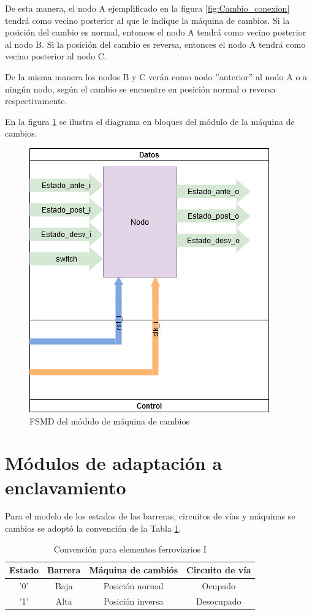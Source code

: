 	De esta manera, el nodo A ejemplificado en la figura \ref{fig:Cambio_conexion} tendrá como vecino posterior al que le indique la máquina de cambios. Si la posición del cambio es normal, entonces el nodo A tendrá como vecino posterior al nodo B. Si la posición del cambio es reversa, entonces el nodo A tendrá como vecino posterior al nodo C.
	
	De la misma manera los nodos B y C verán como nodo ''anterior'' al nodo A o a ningún nodo, según el cambio se encuentre en posición normal o reversa respectivamente.	
	
	En la figura \ref{fig:FSMD_Cambio} se ilustra el diagrama en bloques del módulo de la máquina de cambios.
	
	\begin{figure}[h]
	\centering
	\includegraphics[scale=.5]{./Figures/FSMD-Cambio}
		\caption{FSMD del módulo de máquina de cambios}
		\label{fig:FSMD_Cambio}
	\end{figure}
		
	
\section{Módulos de adaptación a enclavamiento}
	
	Para el modelo de los estados de las barreras, circuitos de vías y máquinas se cambios se adoptó la convención de la Tabla \ref{Bool_1}.
	
	\begin{table}[!hbt]
	\renewcommand{\arraystretch}{1.3}
	\caption{Convención para elementos ferroviarios I}
	\label{Bool_1}
	\centering
	\begin{tabular}{ c  c  c  c }
	\hline	
	Estado & Barrera & Máquina de cambiós & Circuito de vía \\	
	\hline
	'0' & Baja & Posición normal & Ocupado \\	
	'1' & Alta & Posición inversa & Desocupado \\	
	\hline
	\end{tabular}
	\end{table}	
	
